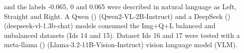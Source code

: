 and the labels -0.065, 0 and 0.065 were described in natural language as Left, Straight and Right. A Qwen (\cite{bai2023qwen}) (Qwen2-VL-2B-Instruct) and a DeepSeek (\cite{zeng2024deepseek}) (deepseek-vl-1.3b-chat) models consumed the Img+Q+L balanced and unbalanced datasets (Ids 14 and 15). Dataset Ids 16 and 17 were tested with a meta-llama (\cite{meta2024llama3vision}) (Llama-3.2-11B-Vision-Instruct) vision language model (VLM).








